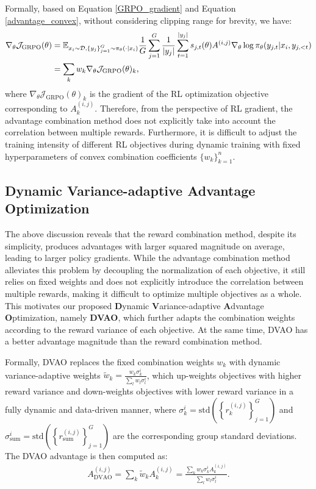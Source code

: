 \documentclass{llmxive}
\begin{document}
Formally, based on Equation \ref{GRPO_gradient} and Equation \ref{advantage_convex}, without considering clipping range for brevity, we have:
\begin{align}
    \nabla_\theta \mathcal{J}_\text{GRPO}(\theta) &= \mathbb{E}_{x_i \sim \mathcal{D},\left\{y_j\right\}_{j=1}^G \sim \pi_\theta(\cdot | x_i)} \frac{1}{G} \sum_{j=1}^G \frac{1}{|y_j|} \sum_{t=1}^{|y_j|} s_{j,t}(\theta)A^{(i,j)} \nabla_\theta\log \pi_\theta (y_{j,t} | x_i, y_{j, <t}) \notag\\
    &= \sum_k w_k \nabla_\theta \mathcal{J}_\text{GRPO}(\theta)_k,
\end{align}
where $\nabla_\theta\mathcal{J}_\text{GRPO}(\theta)_k$ is the gradient of the RL optimization objective corresponding to $A_k^{(i,j)}$. Therefore, from the perspective of RL gradient, the advantage combination method does not explicitly take into account the correlation between multiple rewards. Furthermore, it is difficult to adjust the training intensity of different RL objectives during dynamic training with fixed hyperparameters of convex combination coefficients $\{w_k\}_{k=1}^n$.

\subsection{Dynamic Variance-adaptive Advantage Optimization}
The above discussion reveals that the reward combination method, despite its simplicity, produces advantages with larger squared magnitude on average, leading to larger policy gradients. While the advantage combination method alleviates this problem by decoupling the normalization of each objective, it still relies on fixed weights and does not explicitly introduce the correlation between multiple rewards, making it difficult to optimize multiple objectives as a whole. This motivates our proposed \textbf{D}ynamic \textbf{V}ariance-adaptive \textbf{A}dvantage \textbf{O}ptimization, namely \textbf{DVAO}, which further adapts the combination weights according to the reward variance of each objective. At the same time, DVAO has a better advantage magnitude than the reward combination method.

Formally, DVAO replaces the fixed combination weights $w_k$ with dynamic variance-adaptive weights $\tilde{w}_k = \frac{w_k\sigma_k^i}{\sum_l w_l \sigma_l^i}$, which up-weights objectives with higher reward variance and down-weights objectives with lower reward variance in a fully dynamic and data-driven manner, where $\sigma_k^i = \text{std} \left(\left\{ r_k^{(i,j)} \right\}_{j=1}^G\right)$ and $\sigma_\text{sum}^i = \text{std} \left(\left\{ r_\text{sum}^{(i,j)} \right\}_{j=1}^G\right)$ are the corresponding group standard deviations. The DVAO advantage is then computed as:
\begin{align}
    A_\text{DVAO}^{(i,j)} = \sum_k \tilde{w}_k A_k^{(i,j)} = \frac{\sum_k w_k \sigma_k^i A_k^{(i,j)}}{\sum_l w_l \sigma_l^i}. \label{DVAO}
\end{align}
\end{document}
